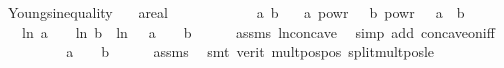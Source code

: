 \begin{isabellebody}
\endisatagproof
{\isafoldproof}%
%
\isadelimproof
\isanewline
%
\endisadelimproof
\isanewline
{}\isamarkupfalse%
\ Youngs{\isacharunderscore}{\kern0pt}inequality{\isacharunderscore}{\kern0pt}{}{\isacharcolon}{\kern0pt}\isanewline
\ \ \ a{\isacharcolon}{\kern0pt}{\isacharcolon}{\kern0pt}real\isanewline
\ \ \ {\isachardoublequoteopen}{}\ {\isasymle}\ {\isasymalpha}{\isachardoublequoteclose}\ {\isachardoublequoteopen}{}\ {\isasymle}\ {\isasymbeta}{\isachardoublequoteclose}\ {\isachardoublequoteopen}{\isasymalpha}{\isacharplus}{\kern0pt}{\isasymbeta}\ {\isacharequal}{\kern0pt}\ {}{\isachardoublequoteclose}\ {\isachardoublequoteopen}a{\isachargreater}{\kern0pt}{}{\isachardoublequoteclose}\ {\isachardoublequoteopen}b{\isachargreater}{\kern0pt}{}{\isachardoublequoteclose}\isanewline
\ \ \ {\isachardoublequoteopen}a\ powr\ {\isasymalpha}\ {\isacharasterisk}{\kern0pt}\ b\ powr\ {\isasymbeta}\ {\isasymle}\ {\isasymalpha}{\isacharasterisk}{\kern0pt}a\ {\isacharplus}{\kern0pt}\ {\isasymbeta}{\isacharasterisk}{\kern0pt}b{\isachardoublequoteclose}\isanewline
%
\isadelimproof
%
\endisadelimproof
%
\isatagproof
{}\isamarkupfalse%
\ {\isacharminus}{\kern0pt}\isanewline
\ \ \isamarkupfalse%
\ {\isachardoublequoteopen}{\isasymalpha}\ {\isacharasterisk}{\kern0pt}\ ln\ a\ {\isacharplus}{\kern0pt}\ {\isasymbeta}\ {\isacharasterisk}{\kern0pt}\ ln\ b\ {\isasymle}\ ln\ {\isacharparenleft}{\kern0pt}{\isasymalpha}\ {\isacharasterisk}{\kern0pt}\ a\ {\isacharplus}{\kern0pt}\ {\isasymbeta}\ {\isacharasterisk}{\kern0pt}\ b{\isacharparenright}{\kern0pt}{\isachardoublequoteclose}\isanewline
\ \ \ \ \isamarkupfalse%
\ assms\ ln{\isacharunderscore}{\kern0pt}concave\ \isamarkupfalse%
\ {\isacharparenleft}{\kern0pt}simp\ add{\isacharcolon}{\kern0pt}\ concave{\isacharunderscore}{\kern0pt}on{\isacharunderscore}{\kern0pt}iff{\isacharparenright}{\kern0pt}\isanewline
\ \ \isamarkupfalse%
\ \isamarkupfalse%
\ {\isachardoublequoteopen}{}\ {\isacharless}{\kern0pt}\ {\isasymalpha}\ {\isacharasterisk}{\kern0pt}\ a\ {\isacharplus}{\kern0pt}\ {\isasymbeta}\ {\isacharasterisk}{\kern0pt}\ b{\isachardoublequoteclose}\isanewline
\ \ \ \ \isamarkupfalse%
\ assms\ \isamarkupfalse%
\ {\isacharparenleft}{\kern0pt}smt\ {\isacharparenleft}{\kern0pt}verit{\isacharparenright}{\kern0pt}\ mult{\isacharunderscore}{\kern0pt}pos{\isacharunderscore}{\kern0pt}pos\ split{\isacharunderscore}{\kern0pt}mult{\isacharunderscore}{\kern0pt}pos{\isacharunderscore}{\kern0pt}le{\isacharparenright}{\kern0pt}\isanewline

\end{isabellebody}
